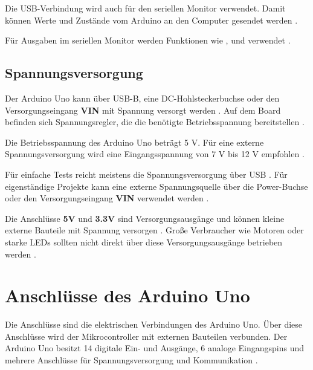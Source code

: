Die USB-Verbindung wird auch für den seriellen Monitor verwendet. Damit können Werte und Zustände vom Arduino an den Computer gesendet werden \cite{arduino:language-reference}.

Für Ausgaben im seriellen Monitor werden Funktionen wie ,  und  verwendet \cite{arduino:language-reference}.



\subsection{Spannungsversorgung}



Der Arduino Uno kann über USB-B, eine DC-Hohlsteckerbuchse oder den Versorgungseingang \textbf{VIN} mit Spannung versorgt werden \cite{arduino:uno-datasheet}. Auf dem Board befinden sich Spannungsregler, die die benötigte Betriebsspannung bereitstellen \cite{arduino:uno-components}.

Die Betriebsspannung des Arduino Uno beträgt 5 V. Für eine externe Spannungsversorgung wird eine Eingangsspannung von 7 V bis 12 V empfohlen \cite{arduino:uno-datasheet}.


Für einfache Tests reicht meistens die Spannungsversorgung über USB \cite{arduino:uno-components}. Für eigenständige Projekte kann eine externe Spannungsquelle über die Power-Buchse oder den Versorgungseingang \textbf{VIN} verwendet werden \cite{arduino:uno-datasheet}.

Die Anschlüsse \textbf{5V} und \textbf{3.3V} sind Versorgungsausgänge und können kleine externe Bauteile mit Spannung versorgen \cite{arduino:uno-datasheet}. Große Verbraucher wie Motoren oder starke LEDs sollten nicht direkt über diese Versorgungsausgänge betrieben werden \cite{arduino:uno-components}.





\section{Anschlüsse des Arduino Uno}



Die Anschlüsse sind die elektrischen Verbindungen des Arduino Uno. Über diese Anschlüsse wird der Mikrocontroller mit externen Bauteilen verbunden. Der Arduino Uno besitzt 14 digitale Ein- und Ausgänge, 6 analoge Eingangspins und mehrere Anschlüsse für Spannungsversorgung und Kommunikation \cite{arduino:uno-r3}\cite{arduino:uno-datasheet}.

